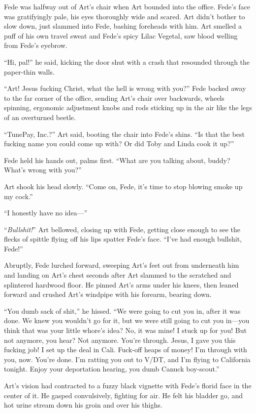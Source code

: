 Fede was halfway out of Art’s chair when Art bounded into the
office. Fede’s face was gratifyingly pale, his eyes thoroughly wide
and scared. Art didn’t bother to slow down, just slammed into Fede,
bashing foreheads with him. Art smelled a puff of his own travel
sweat and Fede’s spicy Lilac Vegetal, saw blood welling from Fede’s
eyebrow.

“Hi, pal!” he said, kicking the door shut with a crash that
resounded through the paper-thin walls.

“Art! Jesus fucking Christ, what the hell is wrong with you?” Fede
backed away to the far corner of the office, sending Art’s chair
over backwards, wheels spinning, ergonomic adjustment knobs and
rods sticking up in the air like the legs of an overturned beetle.

“TunePay, Inc.?” Art said, booting the chair into Fede’s shins. “Is
that the best fucking name you could come up with? Or did Toby and
Linda cook it up?”

Fede held his hands out, palms first. “What are you talking about,
buddy? What’s wrong with you?”

Art shook his head slowly. “Come on, Fede, it’s time to stop
blowing smoke up my cock.”

“I honestly have no idea—”

“\emph{Bullshit!}” Art bellowed, closing up with Fede, getting
close enough to see the flecks of spittle flying off his lips
spatter Fede’s face. “I’ve had enough bullshit, Fede!”

Abruptly, Fede lurched forward, sweeping Art’s feet out from
underneath him and landing on Art’s chest seconds after Art slammed
to the scratched and splintered hardwood floor. He pinned Art’s
arms under his knees, then leaned forward and crushed Art’s
windpipe with his forearm, bearing down.

“You dumb sack of shit,” he hissed. “We were going to cut you in,
after it was done. We knew you wouldn’t go for it, but we were
still going to cut you in—you think that was your little whore’s
idea? No, it was mine! I stuck up for you! But not anymore, you
hear? Not anymore. You’re through. Jesus, I gave you this fucking
job! I set up the deal in Cali. Fuck-off heaps of money! I’m
through with you, now. You’re done. I’m ratting you out to V/DT,
and I’m flying to California tonight. Enjoy your deportation
hearing, you dumb Canuck boy-scout.”

Art’s vision had contracted to a fuzzy black vignette with Fede’s
florid face in the center of it. He gasped convulsively, fighting
for air. He felt his bladder go, and hot urine stream down his
groin and over his thighs.

